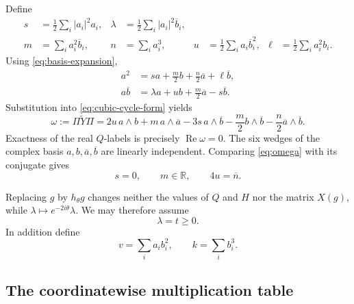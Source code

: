 \documentclass[11pt,reqno]{amsart}
\theoremstyle{definition}
\theoremstyle{remark}
\newcommand{\R}{\mathbb R}
\newcommand{\abs}[1]{\left\lvert #1\right\rvert}
\begin{document}
Define
\begin{align}
s&=\frac12\sum_i\abs{a_i}^2a_i,
&\lambda&=\frac12\sum_i\abs{a_i}^2\overline b_i,\label{eq:s-lambda}\\
m&=\sum_i a_i^2\overline b_i,
&n&=\sum_i a_i^3,
&u&=\frac12\sum_i a_i\overline b_i^2,
&\ell&=\frac12\sum_i a_i^2b_i.\label{eq:m-n-u-ell}
\end{align}
Using \eqref{eq:basis-expansion},
\begin{align}
a^2&=sa+\frac m2b+\frac n2\overline a+\ell\overline b,
\label{eq:a2-expansion}\\
a\overline b&=\lambda a+ub+\frac m2\overline a-s\overline b.
\label{eq:abbar-expansion}
\end{align}
Substitution into \eqref{eq:cubic-cycle-form} yields
\begin{equation}\label{eq:omega}
\omega:=\Pi\widetilde Y\Pi
=2u\,a\wedge b
+m\,a\wedge\overline a
-3s\,a\wedge\overline b
-\frac m2b\wedge\overline b
-\frac n2\overline a\wedge\overline b.
\end{equation}
Exactness of the real $Q$-labels is precisely $\operatorname{Re}\omega=0$.
The six wedges of the complex basis $a,b,\overline a,\overline b$ are linearly
independent.  Comparing \eqref{eq:omega} with its conjugate gives
\begin{equation}\label{eq:cubic-exactness-conditions}
s=0,
\qquad m\in\R,
\qquad 4u=\overline n.
\end{equation}

Replacing $g$ by $h_\theta g$ changes neither the values of $Q$ and $H$ nor
the matrix $X(g)$, while
$\lambda\mapsto e^{-2i\theta}\lambda$.  We may therefore assume
\begin{equation}\label{eq:t-gauge}
\lambda=t\ge0.
\end{equation}
In addition define
\begin{equation}\label{eq:v-k}
v=\sum_i a_ib_i^2,
\qquad
k=\sum_i b_i^3.
\end{equation}

\subsection{The coordinatewise multiplication table}
\end{document}
